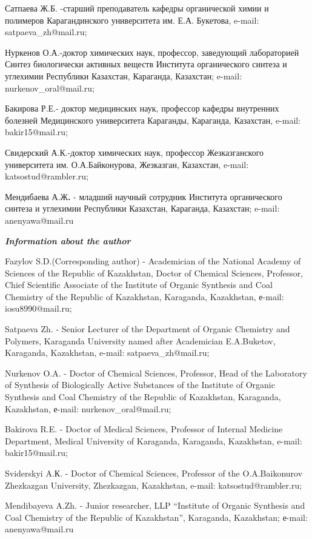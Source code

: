 Сатпаева Ж.Б. -старший преподаватель кафедры органической химии и
полимеров Карагандинского университета им. Е.А. Букетова, e-mail:
satpaeva\_zh@mail.ru;

Нуркенов О.А.-доктор химических наук, профессор, заведующий лабораторией
Синтез биологически активных веществ Института органического синтеза и
углехимии Республики Казахстан, Караганда, Казахстан; e-mail:
nurkenov\_oral@mail.ru;

Бакирова Р.Е.- доктор медицинских наук, профессор кафедры внутренних
болезней Медицинского университета Караганды, Караганда, Казахстан,
e-mail: bakir15@mail.ru;

Свидерский А.К.-доктор химических наук, профессор Жезказганского
университета им. О.А.Байконурова, Жезказган, Казахстан, e-mail:
katsostud@rambler.ru;

Мендибаева А.Ж{\bfseries .} - младший научный сотрудник Института
органического синтеза и углехимии Республики Казахстан, Караганда,
Казахстан; e-mail: anenyawa@mail.ru

\emph{{\bfseries Information about the author}}

Fazylov S.D.(Corresponding author) - Academician of the National Academy
of Sciences of the Republic of Kazakhstan, Doctor of Chemical Sciences,
Professor, Chief Scientific Associate of the Institute of Organic
Synthesis and Coal Chemistry of the Republic of Kazakhstan, Karaganda,
Kazakhstan, е-mail: iosu8990@mail.ru;

Satpaeva Zh. - Senior Lecturer of the Department of Organic Chemistry
and Polymers, Karaganda University named after Academician E.A.Buketov,
Karaganda, Kazakhstan, e-mail: satpaeva\_zh@mail.ru;

Nurkenov O.A. - Doctor of Chemical Sciences, Professor, Head of the
Laboratory of Synthesis of Biologically Active Substances of the
Institute of Organic Synthesis and Coal Chemistry of the Republic of
Kazakhstan, Karaganda, Kazakhstan, е-mail: nurkenov\_oral@mail.ru;

Bakirova R.E. - Doctor of Medical Sciences, Professor of Internal
Medicine Department, Medical University of Karaganda, Karaganda,
Kazakhstan, e-mail: bakir15@mail.ru;

Sviderskyi A.К. - Doctor of Chemical Sciences, Professor of the
O.A.Baikonurov Zhezkazgan University, Zhezkazgan, Kazakhstan, e-mail:
katsostud@rambler.ru;

Mendibayeva A.Zh. - Junior researcher, LLP ``Institute of Organic
Synthesis and Coal Chemistry of the Republic of Kazakhstan'', Karaganda,
Kazakhstan; е-mail: anenyawa@mail.ru

